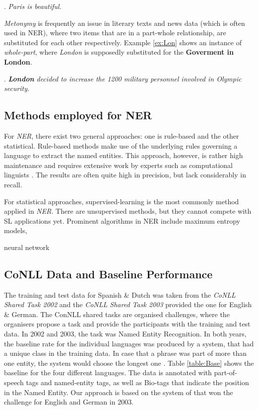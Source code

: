 \documentclass[11pt]{article}
\begin{document}
\ex. \emph{Paris is beautiful.} \label{ex:Paris}

\emph{Metonymy} is frequently an issue in literary texts and news data (which is often used in NER), where two items that are in a part-whole
relationship, are substituted for each other respectively. Example \ref{ex:Lon} shows an instance of \emph{whole-part}, 
where \emph{London} is supposedly substituted for the \textbf{Goverment in London}. 

\ex. \emph{\textbf{London} decided to increase the 1200 military personnel involved in Olympic security.} \label{ex:Lon}

\subsection{Methods employed for NER}
For \emph{NER}, there exist two general approaches: one is rule-based and the other statistical. 
Rule-based methods make use of the underlying rules governing a language to extract the named entities. 
This approach, however, is rather high maintenance and requires extensive work by experts such as computational linguists \cite{nadeau2007survey}.
The results are often quite high in precision, but lack considerably in recall. %

For statistical approaches, supervised-learning is the most commonly method applied in \emph{NER}. 
There are unsupervised methods, but they cannot compete with SL applications yet.
Prominent algorithms in NER include maximum entropy models, 

neural network



\subsection{CoNLL Data and Baseline Performance}
The training and test data for Spanish \& Dutch was taken from the \emph{CoNLL Shared Task 2002} \cite{tksintro} and 
the \emph{CoNLL Shared Task 2003} \cite{TjongKimSang:2003:ICS:1119176.1119195} provided the one for English \& German.
The ConNLL shared tasks are organised challenges, where the organisers propose a task and provide the participants with the
training and test data. 
In 2002 and 2003, the task was Named Entity Recognition. 
In both years, the baseline rate for the individual languages was produced by a system, that had a unique class in the training data. 
In case that a phrase was part of more than one entity, the system would choose the longest one \cite{TjongKimSang:2003:ICS:1119176.1119195}. 
Table \ref{table:Base} shows the baseline for the four different languages.  
The data is annotated with part-of-speech tags and named-entity tags, as well as Bio-tags that indicate the position in the Named Entity. %
Our approach is based on the system of \cite{strlearn} that won the challenge for English and German in 2003. 
\end{document}
